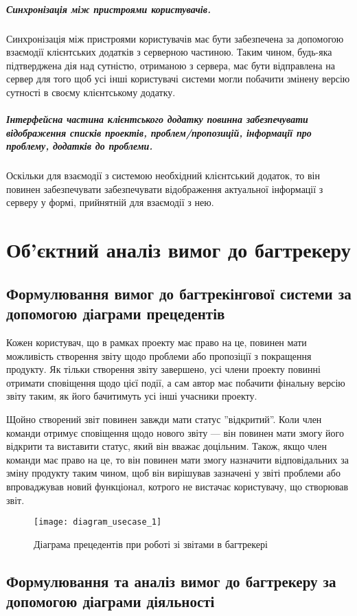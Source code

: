 \documentclass[../main.tex]{subfiles}
\begin{document}
		\subparagraph{Синхронізація між пристроями користувачів.}
		Синхронізація між пристроями користувачів має бути забезпечена за допомогою взаємодії клієнтських додатків з серверною частиною. Таким чином, будь-яка підтверджена дія над сутністю, отриманою з сервера, має бути відправлена на сервер для того щоб усі інші користувачі системи могли побачити змінену версію сутності в своєму клієнтському додатку.
		
		\subparagraph{Інтерфейсна частина клієнтського додатку повинна забезпечувати відображення списків проектів, проблем/пропозицій, інформації про проблему, додатків до проблеми.}
		Оскільки для взаємодії з системою необхідний клієнтський додаток, то він повинен забезпечувати забезпечувати відображення актуальної інформації з серверу у формі, прийнятній для взаємодії з нею.

\section{Об'єктний аналіз вимог до багтрекеру}

	\subsection{Формулювання вимог до багтрекінгової системи за допомогою діаграми прецедентів}
	
	Кожен користувач, що в рамках проекту має право на це, повинен мати можливість створення звіту щодо проблеми або пропозіції з покращення продукту. Як тільки створення звіту завершено, усі члени проекту повинні отримати сповіщення щодо цієї події, а сам автор має побачити фінальну версію звіту таким, як його бачитимуть усі інші учасники проекту.
	
	Щойно створений звіт повинен завжди мати статус ''відкритий''. Коли член команди отримує сповіщення щодо нового звіту — він повинен мати змогу його відкрити та виставити статус, який він вважає доцільним. Також, якщо член команди має право на це, то він повинен мати змогу назначити відповідальних за зміну продукту таким чином, щоб він вирішував зазначені у звіті проблеми або впроваджував новий функціонал, котрого не вистачає користувачу, що створював звіт.
	
	\begin{figure}[H]
	\centering
	\texttt{[image: diagram\_usecase\_1]}
	\caption{Діаграма прецедентів при роботі зі звітами в багтрекері}
	\end{figure}
	
	\subsection{Формулювання та аналіз вимог до багтрекеру за допомогою діаграми діяльності}
	
\end{document}
